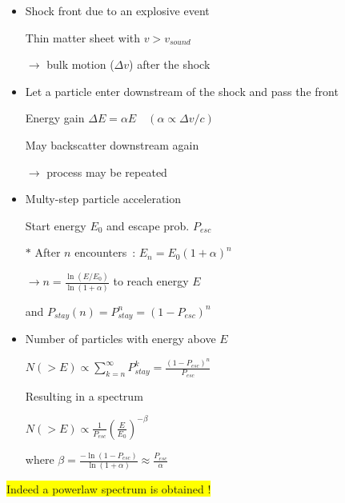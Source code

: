 \Tr
{}%
\begin{itemize}
\item Shock front due to an explosive event
\item[] Thin matter sheet with $v>v_{sound}$
\item[] $\rightarrow$ bulk motion ($\Delta v$) after the shock
\item Let a particle enter downstream of the shock
      and pass the front
\item[] {\blue Energy gain $\Delta E=\alpha E \quad (\alpha \propto \Delta v/c)$}
\item[] May backscatter downstream again
\item[] $\rightarrow$ process may be repeated
\item {\blue Multy-step particle acceleration}
\item[] Start energy $E_{0}$ and escape prob. $P_{esc}$
\item[$\ast$] After $n$ encounters~: $E_{n}=E_{0}(1+\alpha)^{n}$
\item[] $\rightarrow n=\frac{\ln(E/E_{0})}{\ln(1+\alpha)}$ to reach energy $E$
\item[] and $P_{stay}(n)=P_{stay}^{n}=(1-P_{esc})^{n}$
\end{itemize}

\newpage

\begin{itemize}
\item Number of particles with energy above $E$
\item[] $\displaystyle N(>E) \propto \sum_{k=n}^{\infty} P_{stay}^{k}
        =\frac{\left(1-P_{esc}\right)^{n}}{P_{esc}}$
\item[] Resulting in a spectrum
\item[] \begin{center}
        {\blue $N(>E) \propto \frac{1}{P_{esc}} \left(\frac{E}{E_{0}}\right)^{-\beta}$}
        \end{center}
\item[] where $\beta=\frac{-\ln(1-P_{esc})}{\ln(1+\alpha)} \approx \frac{P_{esc}}{\alpha}$
\end{itemize}

\begin{center}
\colorbox{yellow}{Indeed a powerlaw spectrum is obtained !}
\end{center}

